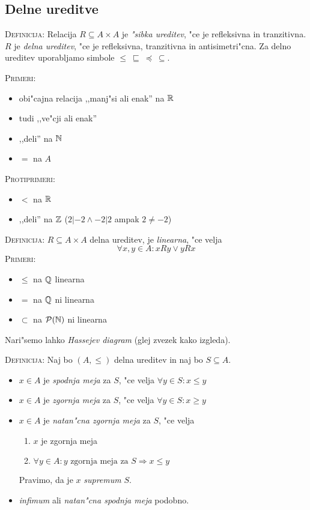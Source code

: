 \subsection{Delne ureditve}
\textsc{Definicija:} Relacija $R \subseteq A \times A$ je \emph{"sibka ureditev}, "ce je refleksivna in tranzitivna. $R$ je \emph{delna ureditev}, "ce je refleksivna, tranzitivna in antisimetri"cna. Za delno ureditev uporabljamo simbole $\leq\ \sqsubseteq\ \preccurlyeq\ \subseteq$.

\textsc{Primeri:}
\begin{itemize}
	\item obi"cajna relacija  ,,manj"si ali enak'' na $\mathbb{R}$
	\item tudi ,,ve"cji ali enak''
	\item ,,deli'' na $\mathbb{N}$
	\item $=$ na $A$
\end{itemize}
\textsc{Protiprimeri:}
\begin{itemize}
	\item $<$ na $\mathbb{R}$
	\item ,,deli'' na $\mathbb{Z}$ ($2 | -2 \land -2 | 2$ ampak $2 \neq -2$)
\end{itemize}
%
\textsc{Definicija:} $R \subseteq A \times A$ delna ureditev, je \emph{linearna}, "ce velja
\begin{equation*}
\forall x,y \in A: x R y \lor y R x
\end{equation*}
\textsc{Primeri:}
\begin{itemize}
	\item $\leq$ na $\mathbb{Q}$ linearna
	\item $=$ na $\mathbb{Q}$ ni linearna
	\item $\subset$ na $\mathcal{P}(\mathbb{N})$ ni linearna
\end{itemize}
Nari"semo lahko \emph{Hassejev diagram} (glej zvezek kako izgleda).

\textsc{Definicija:} Naj bo $(A, \leq)$ delna ureditev in naj bo $S \subseteq A$.
\begin{itemize}
	\item $x \in A$ je \emph{spodnja meja} za $S$, "ce velja $\forall y \in S: x \leq y$
	\item $x \in A$ je \emph{zgornja meja} za $S$, "ce velja $\forall y \in S: x \geq y$
	\item $x \in A$ je \emph{natan"cna zgornja meja} za $S$, "ce velja
	\begin{enumerate}
		\item $x$ je zgornja meja
		\item $\forall y \in A: y \text{ zgornja meja za $S$} \Rightarrow x \leq y$
	\end{enumerate}
	Pravimo, da je $x$ \emph{supremum} $S$.
	\item \emph{infimum} ali \emph{natan"cna spodnja meja} podobno.
\end{itemize}